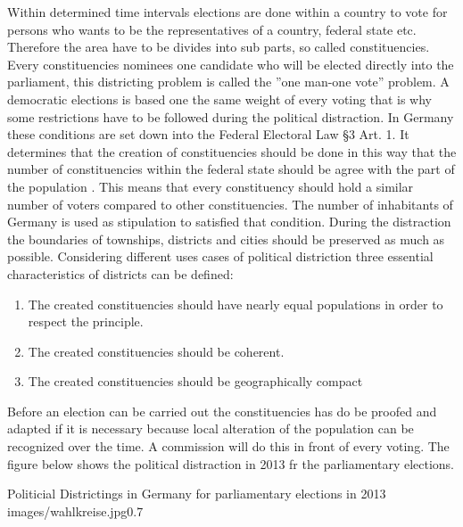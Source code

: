 Within determined time intervals elections are done within a country to vote for persons who wants to be the representatives of a country, federal state etc. Therefore the area have to be divides into sub parts, so called constituencies. Every constituencies nominees one candidate who will be elected directly into the parliament, this districting problem is called the ''one man-one vote'' problem.  A democratic elections is based one the same weight of every voting that is why some restrictions have to be followed during the political distraction. In Germany these conditions are set down into the Federal Electoral Law §3 Art. 1. It determines that the creation of constituencies should be done in this way that the number of constituencies within the federal state should be agree with the part of the population \cite{bund}. This means that every constituency should hold a similar number of voters compared to other constituencies. The number of inhabitants of Germany is used as stipulation to satisfied that condition. During the distraction the boundaries of townships, districts and cities should be preserved as much as possible. Considering different uses cases of political distriction three essential characteristics of districts can be defined:
\begin{enumerate}
	\item The created constituencies should have nearly equal populations in order to respect the principle.
	\item The  created constituencies should be coherent.
	\item  The created constituencies should be geographically compact
\end{enumerate}

Before an election can be carried out the constituencies has do be proofed and adapted if it is necessary because local alteration of the population can be recognized over the time. A commission will do this in front of every voting. The figure below shows the political distraction in 2013 fr the parliamentary elections.


\begin{figurevarSize}{Politicial Districtings in Germany for parliamentary elections in 2013 \cite{bund}}{images/wahlkreise.jpg}{0.7}\end{figurevarSize}


